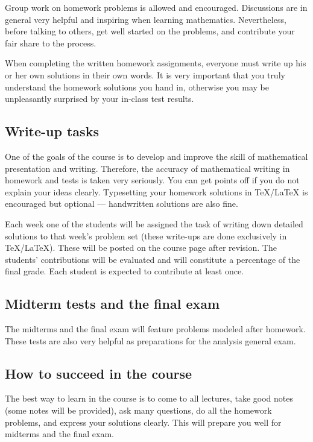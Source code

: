 \documentclass[oneside,11pt]{amsart}
\begin{document}
Group work on homework problems is allowed and encouraged.
Discussions are in general very
helpful and inspiring when learning mathematics.
Nevertheless, before talking to others, get well started
on the problems, and contribute your fair share to the process.

When completing the written homework assignments, everyone must write up his or her own
solutions in their own words.
It is very important that you truly understand the homework solutions you hand
in, otherwise you may be unpleasantly surprised by your in-class test results.

\subsection{Write-up tasks}

One of the goals of the course is to develop and improve
the skill of mathematical presentation and writing.
Therefore, the accuracy of mathematical writing
in homework and tests
is taken very seriously. You can get points off
if you do not explain your ideas clearly.
Typesetting your homework solutions in \TeX/\LaTeX{} is encouraged
but optional --- handwritten solutions are also fine.

Each week one of the students will be assigned the task of
writing down
detailed solutions to that week’s problem set (these write-ups are done
exclusively in \TeX/\LaTeX{}). 
These will be posted on the
course page after revision. The students' contributions will be evaluated and
will constitute a percentage of the final grade. Each student is expected
to contribute at least once.

\subsection{Midterm tests and the final exam}

The midterms and the final exam will feature
problems modeled after homework.
These tests are also very helpful as preparations 
for the analysis general exam.

\subsection{How to succeed in the course}

The best way to learn in the course is to come to all lectures, take good notes
(some notes will be provided),
ask many questions,
do all the homework problems, and express your solutions
clearly.
This will prepare you well for midterms and the final exam.
\end{document}
